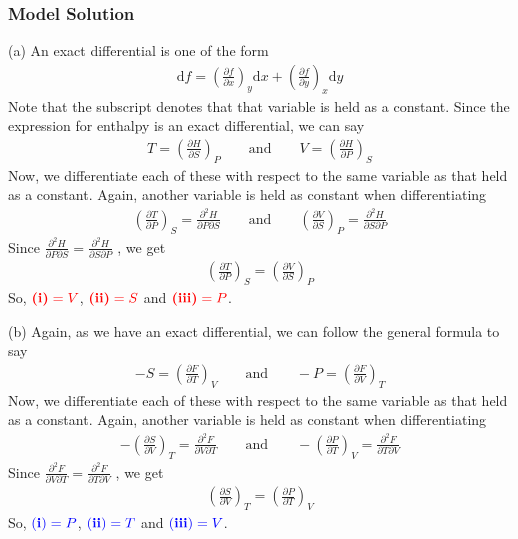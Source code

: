 \documentclass[a4paper,10pt]{article}
\begin{document}
\subsubsection{Model Solution}
(a) An exact differential is one of the form \begin{align*} \text{d}f = \left(\frac{\partial f}{\partial x}\right)_y \text{d}x + \left(\frac{\partial f}{\partial y}\right)_x \text{d}y \end{align*} Note that the subscript denotes that that variable is held as a constant. Since the expression for enthalpy is an exact differential, we can say \begin{align*} T = \left(\frac{\partial H}{\partial S}\right)_P \qquad \text{and} \qquad V = \left(\frac{\partial H}{\partial P}\right)_S \end{align*} Now, we differentiate each of these with respect to the same variable as that held as a constant. Again, another variable is held as constant when differentiating \begin{align*} \left(\frac{\partial T}{\partial P}\right)_S = \frac{\partial^2 H}{\partial P \partial S} \qquad \text{and} \qquad \left(\frac{\partial V}{\partial S}\right)_P = \frac{\partial^2 H}{\partial S \partial P} \end{align*} Since $ \frac{\partial^2 H}{\partial P \partial S} = \frac{\partial^2 H}{\partial S \partial P} $ , we get \begin{align*} \left(\frac{\partial T}{\partial P}\right)_S = \left(\frac{\partial V}{\partial S}\right)_P \end{align*} So, $\color{red}{\textbf{(i)}} = V$, $\color{red}{\textbf{(ii)}} = S$ and $\color{red}{\textbf{(iii)}} = P$.

(b) Again, as we have an exact differential, we can follow the general formula to say \begin{align*} -S = \left(\frac{\partial F}{\partial T}\right)_V \qquad \text{and} \qquad -P = \left(\frac{\partial F}{\partial V}\right)_T \end{align*} Now, we differentiate each of these with respect to the same variable as that held as a constant. Again, another variable is held as constant when differentiating \begin{align*} -\left(\frac{\partial S}{\partial V}\right)_T = \frac{\partial^2 F}{\partial V \partial T} \qquad \text{and} \qquad -\left(\frac{\partial P}{\partial T}\right)_V = \frac{\partial^2 F}{\partial T \partial V} \end{align*} Since $ \frac{\partial^2 F}{\partial V \partial T} = \frac{\partial^2 F}{\partial T \partial V} $ , we get \begin{align*} \left(\frac{\partial S}{\partial V}\right)_T = \left(\frac{\partial P}{\partial T}\right)_V \end{align*} So, $\color{blue}{\mathbf{(i)}} = P$, $\color{blue}{\mathbf{(ii)}} = T$ and $\color{blue}{\mathbf{(iii)}} = V$.
\end{document}
